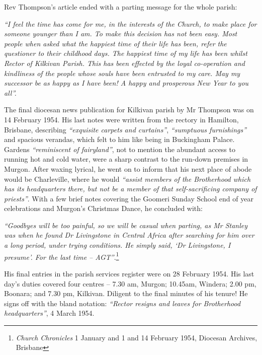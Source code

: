 Rev Thompson's article ended with a parting message for the whole parish:



\emph{``I feel the time has come for me, in the interests of the Church, to make place for someone younger than I am. To make this decision has not been easy. Most people when asked what the happiest time of their life has been, refer the questioner to their childhood days. The happiest time of my life has been whilst Rector of Kilkivan Parish. This has been effected by the loyal co-operation and kindliness of the people whose souls have been entrusted to my care. May my successor be as happy as I have been! A happy and prosperous New Year to you all''.}



The final diocesan news publication for Kilkivan parish by Mr Thompson was on 14 February 1954. His last notes were written from the rectory in Hamilton, Brisbane, describing \emph{``exquisite carpets and curtains''}, \emph{``sumptuous furnishings''} and spacious verandas, which felt to him like being in Buckingham Palace. Gardens \emph{``reminiscent of fairyland''}, not to mention the abundant access to running hot and cold water, were a sharp contrast to the run-down premises in Murgon. After waxing lyrical, he went on to inform that his next place of abode would be Charleville, where he would \emph{``assist members of the Brotherhood which has its headquarters there, but not be a member of that self-sacrificing company of priests''}. With a few brief notes covering the Goomeri Sunday School end of year celebrations and Murgon's Christmas Dance, he concluded with:



\emph{``Goodbyes will be too painful, so we will be casual when parting, as Mr Stanley was when he found Dr Livingstone in Central Africa after searching for him over a long period, under trying conditions. He simply said, `Dr Livingstone, I presume'. For the last time -- AGT''}.\footnote{\emph{Church Chronicles} 1 January and 1 and 14 February 1954, Diocesan Archives, Brisbane}


\smallskip


\balance


His final entries in the parish services register were on 28 February 1954. His last day's duties covered four centres -- 7.30 am, Murgon; 10.45am, Windera; 2.00 pm, Boonara; and 7.30 pm, Kilkivan. Diligent to the final minutes of his tenure! He signs off with the bland notation: \emph{``Rector resigns and leaves for Brotherhood headquarters''}, 4 March 1954.



